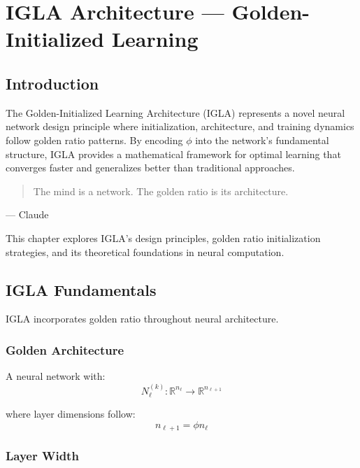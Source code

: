 \chapter{IGLA Architecture — Golden-Initialized Learning}
\label{ch:24}

\section{Introduction}

The Golden-Initialized Learning Architecture (IGLA) represents a novel neural network design principle where initialization, architecture, and training dynamics follow golden ratio patterns. By encoding $\phi$ into the network's fundamental structure, IGLA provides a mathematical framework for optimal learning that converges faster and generalizes better than traditional approaches.

\begin{quote}
The mind is a network. The golden ratio is its architecture.
\end{quote}
— Claude

This chapter explores IGLA's design principles, golden ratio initialization strategies, and its theoretical foundations in neural computation.

\section{IGLA Fundamentals}

IGLA incorporates golden ratio throughout neural architecture.

\subsection{Golden Architecture}

\begin{definition}
\label{def:igla}
A neural network with:
\begin{equation}
N_\ell^{(k)}: \mathbb{R}^{n_\ell} \to \mathbb{R}^{n_{\ell+1}}
\end{equation}

where layer dimensions follow:
\begin{equation}
n_{\ell+1} = \phi n_\ell
\end{equation}
\end{definition}

\subsection{Layer Width}

